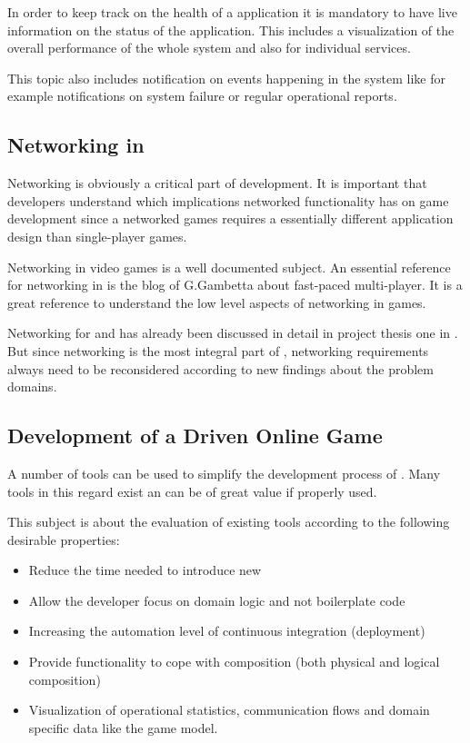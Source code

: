 In order to keep track on the health of a \ms{} application it is mandatory to
have live information on the status of the application. This includes a
visualization of the overall performance of the whole system and also for
individual services.

This topic also includes notification on events happening in the system like for
example notifications on system failure or regular operational reports. 

\subsection{Networking in \ogs{}}
\label{sub:networking_in_online_games}

Networking is obviously a critical part of \og{} development. It is important
that developers understand which implications networked functionality has on
game development since a networked games requires a essentially different
application design than single-player games. 

Networking in video games is a well documented subject. An essential reference
for networking in \ogs{} is the blog of G.Gambetta\cite{gambetta_fast_paced}
about fast-paced multi-player. It is a great reference to understand the low
level aspects of networking in games.

Networking for \mss{} and \og{} has already been discussed in detail in project
thesis one in . But since networking is the
most integral part of \ogs{}, networking requirements always need to be
reconsidered according to new findings about the problem domains.


\subsection{Development of a \ms{} Driven Online Game}

A number of tools can be used to simplify the development process of \ms{}. Many
tools in this regard exist an can be of great value if properly used.

This subject is about the evaluation of existing tools according to the
following desirable properties:

\begin{itemize}
  \item Reduce the time needed to introduce new \mss{}
  \item Allow the developer focus on domain logic and not boilerplate code
  \item Increasing the automation level of continuous integration (deployment)
  \item Provide functionality to cope with \mss{} composition (both physical
  and logical composition)
  \item Visualization of operational statistics, communication flows and domain
  specific data like the game model.
\end{itemize}

